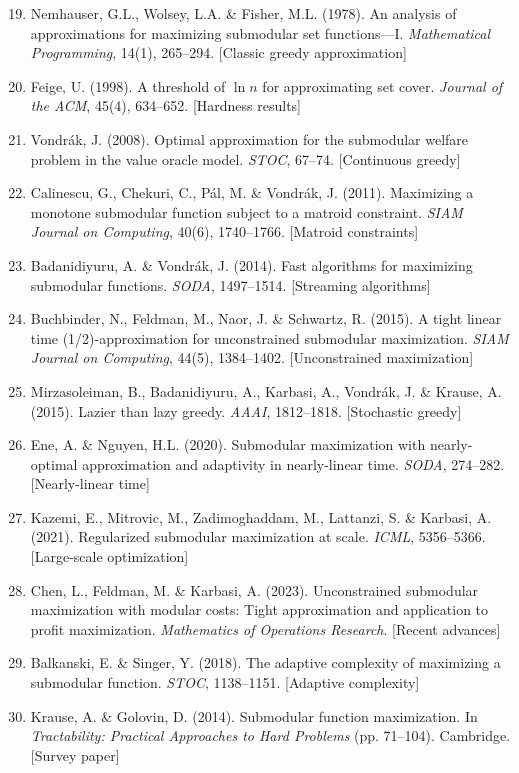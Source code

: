 \begin{enumerate}
    \setcounter{enumi}{18}
    \item Nemhauser, G.L., Wolsey, L.A. \& Fisher, M.L. (1978). An analysis of approximations for maximizing submodular set functions—I. \textit{Mathematical Programming}, 14(1), 265--294. [Classic greedy approximation]

    \item Feige, U. (1998). A threshold of $\ln n$ for approximating set cover. \textit{Journal of the ACM}, 45(4), 634--652. [Hardness results]

    \item Vondrák, J. (2008). Optimal approximation for the submodular welfare problem in the value oracle model. \textit{STOC}, 67--74. [Continuous greedy]

    \item Calinescu, G., Chekuri, C., Pál, M. \& Vondrák, J. (2011). Maximizing a monotone submodular function subject to a matroid constraint. \textit{SIAM Journal on Computing}, 40(6), 1740--1766. [Matroid constraints]

    \item Badanidiyuru, A. \& Vondrák, J. (2014). Fast algorithms for maximizing submodular functions. \textit{SODA}, 1497--1514. [Streaming algorithms]

    \item Buchbinder, N., Feldman, M., Naor, J. \& Schwartz, R. (2015). A tight linear time (1/2)-approximation for unconstrained submodular maximization. \textit{SIAM Journal on Computing}, 44(5), 1384--1402. [Unconstrained maximization]

    \item Mirzasoleiman, B., Badanidiyuru, A., Karbasi, A., Vondrák, J. \& Krause, A. (2015). Lazier than lazy greedy. \textit{AAAI}, 1812--1818. [Stochastic greedy]

    \item Ene, A. \& Nguyen, H.L. (2020). Submodular maximization with nearly-optimal approximation and adaptivity in nearly-linear time. \textit{SODA}, 274--282. [Nearly-linear time]

    \item Kazemi, E., Mitrovic, M., Zadimoghaddam, M., Lattanzi, S. \& Karbasi, A. (2021). Regularized submodular maximization at scale. \textit{ICML}, 5356--5366. [Large-scale optimization]

    \item Chen, L., Feldman, M. \& Karbasi, A. (2023). Unconstrained submodular maximization with modular costs: Tight approximation and application to profit maximization. \textit{Mathematics of Operations Research}. [Recent advances]

    \item Balkanski, E. \& Singer, Y. (2018). The adaptive complexity of maximizing a submodular function. \textit{STOC}, 1138--1151. [Adaptive complexity]

    \item Krause, A. \& Golovin, D. (2014). Submodular function maximization. In \textit{Tractability: Practical Approaches to Hard Problems} (pp. 71--104). Cambridge. [Survey paper]
\end{enumerate}


